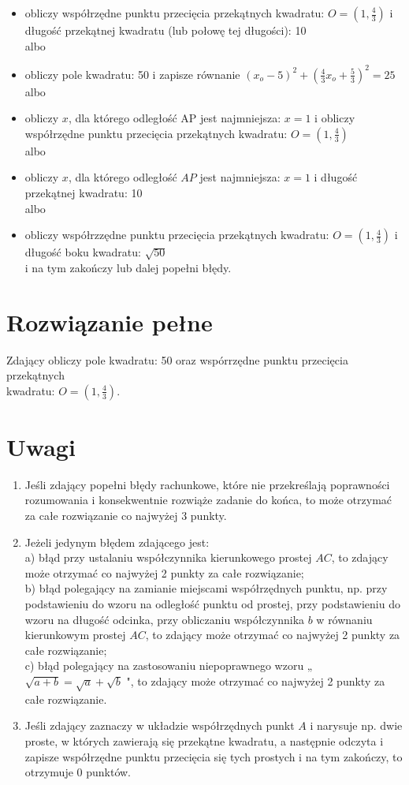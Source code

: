 \documentclass[10pt]{article}
\begin{document}
\begin{itemize}
  \item obliczy współrzędne punktu przecięcia przekątnych kwadratu: $O=\left(1, \frac{4}{3}\right)$ i długość przekątnej kwadratu (lub połowę tej długości): 10\\
albo
  \item obliczy pole kwadratu: 50 i zapisze równanie $\left(x_{o}-5\right)^{2}+\left(\frac{4}{3} x_{o}+\frac{5}{3}\right)^{2}=25$\\
albo
  \item obliczy $x$, dla którego odległość AP jest najmniejsza: $x=1$ i obliczy współrzędne punktu przecięcia przekątnych kwadratu: $O=\left(1, \frac{4}{3}\right)$\\
albo
  \item obliczy $x$, dla którego odległość $A P$ jest najmniejsza: $x=1$ i długość przekątnej kwadratu: 10\\
albo
  \item obliczy współrzzędne punktu przecięcia przekątnych kwadratu: $O=\left(1, \frac{4}{3}\right)$ i długość boku kwadratu: $\sqrt{50}$\\
i na tym zakończy lub dalej popełni błędy.
\end{itemize}

\section*{Rozwiązanie pełne}
Zdający obliczy pole kwadratu: 50 oraz wspórrzędne punktu przecięcia przekątnych\\
kwadratu: $O=\left(1, \frac{4}{3}\right)$.

\section*{Uwagi}
\begin{enumerate}
  \item Jeśli zdający popełni błędy rachunkowe, które nie przekreślają poprawności rozumowania i konsekwentnie rozwiąże zadanie do końca, to może otrzymać za całe rozwiązanie co najwyżej 3 punkty.
  \item Jeżeli jedynym błędem zdającego jest:\\
a) błąd przy ustalaniu współczynnika kierunkowego prostej $A C$, to zdający może otrzymać co najwyżej 2 punkty za całe rozwiązanie;\\
b) błąd polegający na zamianie miejscami współrzędnych punktu, np. przy podstawieniu do wzoru na odległość punktu od prostej, przy podstawieniu do wzoru na długość odcinka, przy obliczaniu współczynnika $b$ w równaniu kierunkowym prostej $A C$, to zdający może otrzymać co najwyżej 2 punkty za całe rozwiązanie;\\
c) błąd polegający na zastosowaniu niepoprawnego wzoru „$\sqrt{a+b}=\sqrt{a}+\sqrt{b}$ ", to zdający może otrzymać co najwyżej 2 punkty za całe rozwiązanie.
  \item Jeśli zdający zaznaczy w układzie współrzędnych punkt $A$ i narysuje np. dwie proste, w których zawierają się przekątne kwadratu, a następnie odczyta i zapisze współrzędne punktu przecięcia się tych prostych i na tym zakończy, to otrzymuje 0 punktów.
\end{enumerate}
\end{document}
